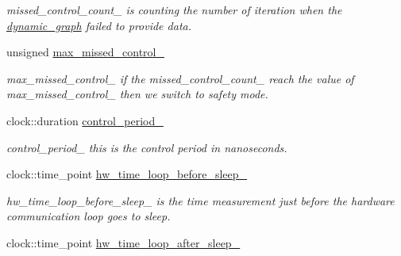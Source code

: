 \begin{DoxyCompactItemize}
\begin{DoxyCompactList}\small\item\em missed\+\_\+control\+\_\+count\+\_\+ is counting the number of iteration when the \hyperlink{namespacedynamic__graph}{dynamic\+\_\+graph} failed to provide data. \end{DoxyCompactList}\item 
unsigned \hyperlink{classdynamic__graph_1_1DynamicGraphManager_a10922e790e039f78b0fabbb5ef944488}{max\+\_\+missed\+\_\+control\+\_\+}\hypertarget{classdynamic__graph_1_1DynamicGraphManager_a10922e790e039f78b0fabbb5ef944488}{}\label{classdynamic__graph_1_1DynamicGraphManager_a10922e790e039f78b0fabbb5ef944488}

\begin{DoxyCompactList}\small\item\em max\+\_\+missed\+\_\+control\+\_\+ if the missed\+\_\+control\+\_\+count\+\_\+ reach the value of max\+\_\+missed\+\_\+control\+\_\+ then we switch to safety mode. \end{DoxyCompactList}\item 
clock\+::duration \hyperlink{classdynamic__graph_1_1DynamicGraphManager_a1006cdb2d7e30e291d3d568923ebbc03}{control\+\_\+period\+\_\+}\hypertarget{classdynamic__graph_1_1DynamicGraphManager_a1006cdb2d7e30e291d3d568923ebbc03}{}\label{classdynamic__graph_1_1DynamicGraphManager_a1006cdb2d7e30e291d3d568923ebbc03}

\begin{DoxyCompactList}\small\item\em control\+\_\+period\+\_\+ this is the control period in nanoseconds. \end{DoxyCompactList}\item 
clock\+::time\+\_\+point \hyperlink{classdynamic__graph_1_1DynamicGraphManager_a26167d2936575dfdbe31be4717b70cc5}{hw\+\_\+time\+\_\+loop\+\_\+before\+\_\+sleep\+\_\+}\hypertarget{classdynamic__graph_1_1DynamicGraphManager_a26167d2936575dfdbe31be4717b70cc5}{}\label{classdynamic__graph_1_1DynamicGraphManager_a26167d2936575dfdbe31be4717b70cc5}

\begin{DoxyCompactList}\small\item\em hw\+\_\+time\+\_\+loop\+\_\+before\+\_\+sleep\+\_\+ is the time measurement just before the hardware communication loop goes to sleep. \end{DoxyCompactList}\item 
clock\+::time\+\_\+point \hyperlink{classdynamic__graph_1_1DynamicGraphManager_a3641066efdd3424bb2bd745f6ba8d315}{hw\+\_\+time\+\_\+loop\+\_\+after\+\_\+sleep\+\_\+}\hypertarget{classdynamic__graph_1_1DynamicGraphManager_a3641066efdd3424bb2bd745f6ba8d315}{}\label{classdynamic__graph_1_1DynamicGraphManager_a3641066efdd3424bb2bd745f6ba8d315}


\end{DoxyCompactItemize}
